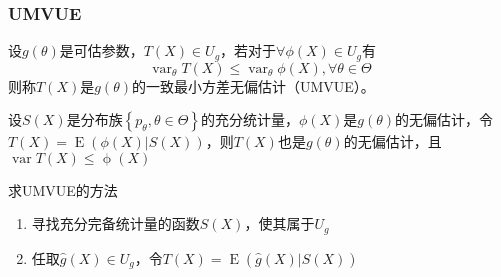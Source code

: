 \subsubsection{UMVUE}
\begin{definition}
    设$g(\theta)$是可估参数，$T(X)\in U_g$，若对于$\forall \phi(X)\in U_g$有
    \[
        \operatorname{var}_{\theta}T(X)\leq \operatorname{var}_{\theta}\phi(X),\forall \theta\in\Theta
    \]
    则称$T(X)$是$g(\theta)$的一致最小方差无偏估计（UMVUE）。
\end{definition}
\begin{lemma}
    设$S(X)$是分布族$\left\{ p_{\theta},\theta\in\Theta \right\}$的充分统计量，$\phi(X)$是$g(\theta)$的无偏估计，令$T(X) = \operatorname{E}(\phi(X)|S(X))$，则$T(X)$也是$g(\theta)$的无偏估计，且$\operatorname{var}T(X)\leq \operatorname{\phi}(X)$
\end{lemma}
\begin{remark}
    求UMVUE的方法
    \begin{enumerate}
        \item 寻找充分完备统计量的函数$S(X)$，使其属于$U_g$
        \item 任取$\hat{g}(X)\in U_g$，令$T(X) = \operatorname{E}(\hat{g}(X)|S(X))$
    \end{enumerate}
\end{remark}
